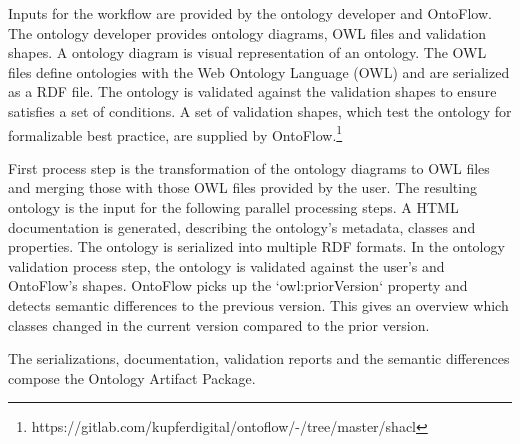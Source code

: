 \documentclass[sigconf]{acmart}
\begin{document}
Inputs for the workflow are provided by the ontology developer and OntoFlow.
The ontology developer provides ontology diagrams, OWL files and validation shapes.
A ontology diagram is visual representation of an ontology.
The OWL files define ontologies with the Web Ontology Language (OWL) and are serialized as a RDF file.
The ontology is validated against the validation shapes to ensure satisfies a set of conditions.
A set of validation shapes, which test the ontology for formalizable best practice, are supplied by OntoFlow.\footnote{https://gitlab.com/kupferdigital/ontoflow/-/tree/master/shacl}

First process step is the transformation of the ontology diagrams to OWL files and merging those with those OWL files provided by the user.
The resulting ontology is the input for the following parallel processing steps.
A HTML documentation is generated, describing the ontology's metadata, classes and properties.
The ontology is serialized into multiple RDF formats.
In the ontology validation process step, the ontology is validated against the user's and OntoFlow's shapes.
OntoFlow picks up the `owl:priorVersion` property and detects semantic differences to the previous version. This gives an overview which classes changed in the current version compared to the prior version.

The serializations, documentation, validation reports and the semantic differences compose the Ontology Artifact Package.
\end{document}
